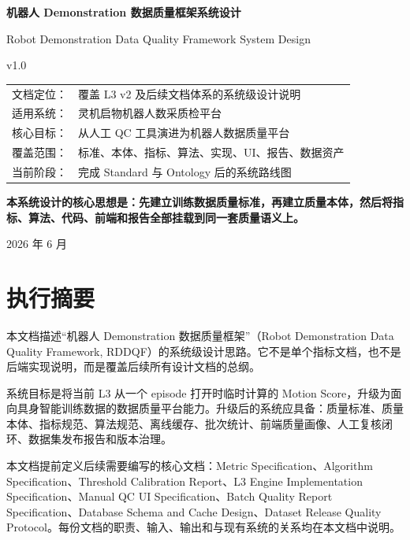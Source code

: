 \documentclass[UTF8,zihao=-4]{ctexart}
\begin{document}
\begin{titlepage}
\centering
\vspace*{2.5cm}
{\Huge\bfseries 机器人 Demonstration 数据质量框架系统设计\par}
\vspace{0.35cm}
{\Large Robot Demonstration Data Quality Framework System Design\par}
\vspace{0.6cm}
{\LARGE v1.0\par}
\vspace{1.2cm}
\begin{tabular}{rl}
文档定位： & 覆盖 L3 v2 及后续文档体系的系统级设计说明 \\
适用系统： & 灵机启物机器人数采质检平台 \\
核心目标： & 从人工 QC 工具演进为机器人数据质量平台 \\
覆盖范围： & 标准、本体、指标、算法、实现、UI、报告、数据资产 \\
当前阶段： & 完成 Standard 与 Ontology 后的系统路线图 \\
\end{tabular}
\vfill
\begin{minipage}{0.86\linewidth}
\centering\large\bfseries
本系统设计的核心思想是：先建立训练数据质量标准，再建立质量本体，然后将指标、算法、代码、前端和报告全部挂载到同一套质量语义上。
\end{minipage}
\vfill
{\large 2026 年 6 月\par}
\end{titlepage}

\tableofcontents
\newpage

\section*{执行摘要}

本文档描述“机器人 Demonstration 数据质量框架”（Robot Demonstration Data Quality Framework, RDDQF）的系统级设计思路。它不是单个指标文档，也不是后端实现说明，而是覆盖后续所有设计文档的总纲。

系统目标是将当前 L3 从一个 episode 打开时临时计算的 Motion Score，升级为面向具身智能训练数据的数据质量平台能力。升级后的系统应具备：质量标准、质量本体、指标规范、算法规范、离线缓存、批次统计、前端质量画像、人工复核闭环、数据集发布报告和版本治理。

本文档提前定义后续需要编写的核心文档：Metric Specification、Algorithm Specification、Threshold Calibration Report、L3 Engine Implementation Specification、Manual QC UI Specification、Batch Quality Report Specification、Database Schema and Cache Design、Dataset Release Quality Protocol。每份文档的职责、输入、输出和与现有系统的关系均在本文档中说明。
\end{document}
